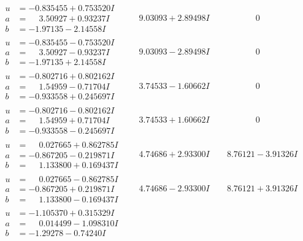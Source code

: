 \documentclass[1p]{elsarticle_modified}
\theoremstyle{definition}
\begin{document}
$$\begin{array}{c|c|c}
\begin{aligned}
u &= -0.835455 + 0.753520 I \\
a &= \phantom{-}3.50927 + 0.93237 I \\
b &= -1.97135 - 2.14558 I\end{aligned}
 & \phantom{-}9.03093 + 2.89498 I & \phantom{-0.000000 } 0 \\ \hline\begin{aligned}
u &= -0.835455 - 0.753520 I \\
a &= \phantom{-}3.50927 - 0.93237 I \\
b &= -1.97135 + 2.14558 I\end{aligned}
 & \phantom{-}9.03093 - 2.89498 I & \phantom{-0.000000 } 0 \\ \hline\begin{aligned}
u &= -0.802716 + 0.802162 I \\
a &= \phantom{-}1.54959 - 0.71704 I \\
b &= -0.933558 + 0.245697 I\end{aligned}
 & \phantom{-}3.74533 - 1.60662 I & \phantom{-0.000000 } 0 \\ \hline\begin{aligned}
u &= -0.802716 - 0.802162 I \\
a &= \phantom{-}1.54959 + 0.71704 I \\
b &= -0.933558 - 0.245697 I\end{aligned}
 & \phantom{-}3.74533 + 1.60662 I & \phantom{-0.000000 } 0 \\ \hline\begin{aligned}
u &= \phantom{-}0.027665 + 0.862785 I \\
a &= -0.867205 - 0.219871 I \\
b &= \phantom{-}1.133800 + 0.169437 I\end{aligned}
 & \phantom{-}4.74686 + 2.93300 I & \phantom{-}8.76121 - 3.91326 I \\ \hline\begin{aligned}
u &= \phantom{-}0.027665 - 0.862785 I \\
a &= -0.867205 + 0.219871 I \\
b &= \phantom{-}1.133800 - 0.169437 I\end{aligned}
 & \phantom{-}4.74686 - 2.93300 I & \phantom{-}8.76121 + 3.91326 I \\ \hline\begin{aligned}
u &= -1.105370 + 0.315329 I \\
a &= \phantom{-}0.014499 - 1.098310 I \\
b &= -1.29278 - 0.74240 I\end{aligned}

\end{array}$$
\end{document}
